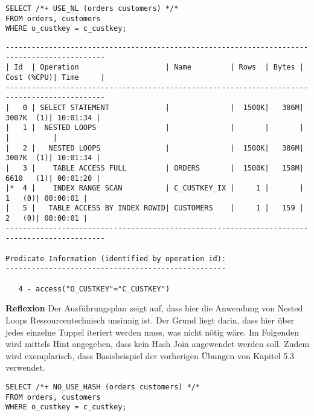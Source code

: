 \documentclass[10pt]{article}
\begin{document}
\begin{lstlisting}[style=sql]
SELECT /*+ USE_NL (orders customers) */*
FROM orders, customers
WHERE o_custkey = c_custkey;
\end{lstlisting}
\begin{lstlisting}[style=queryexecutionplan]
---------------------------------------------------------------------------------------------
| Id  | Operation                    | Name         | Rows  | Bytes | Cost (%CPU)| Time     |
---------------------------------------------------------------------------------------------
|   0 | SELECT STATEMENT             |              |  1500K|   386M|  3007K  (1)| 10:01:34 |
|   1 |  NESTED LOOPS                |              |       |       |            |          |
|   2 |   NESTED LOOPS               |              |  1500K|   386M|  3007K  (1)| 10:01:34 |
|   3 |    TABLE ACCESS FULL         | ORDERS       |  1500K|   158M|  6610   (1)| 00:01:20 |
|*  4 |    INDEX RANGE SCAN          | C_CUSTKEY_IX |     1 |       |     1   (0)| 00:00:01 |
|   5 |   TABLE ACCESS BY INDEX ROWID| CUSTOMERS    |     1 |   159 |     2   (0)| 00:00:01 |
---------------------------------------------------------------------------------------------
 
Predicate Information (identified by operation id):
---------------------------------------------------
 
   4 - access("O_CUSTKEY"="C_CUSTKEY")
\end{lstlisting}
\textbf{Reflexion} \newline
Der Ausführungsplan zeigt auf, dass hier die Anwendung von Nested Loops Ressourcentechnisch unsinnig ist.
Der Grund liegt darin, dass hier über jedes einzelne Tuppel iteriert werden muss, was nicht nötig wäre. \newline
\newline
Im Folgenden wird mittels Hint angegeben, dass kein Hash Join angewendet werden soll.\newline
Zudem wird exemplarisch, dass Basisbeispiel der vorherigen Übungen von Kapitel 5.3 verwendet.
\begin{lstlisting}[style=sql]
SELECT /*+ NO_USE_HASH (orders customers) */*
FROM orders, customers
WHERE o_custkey = c_custkey;
\end{lstlisting}
\end{document}
